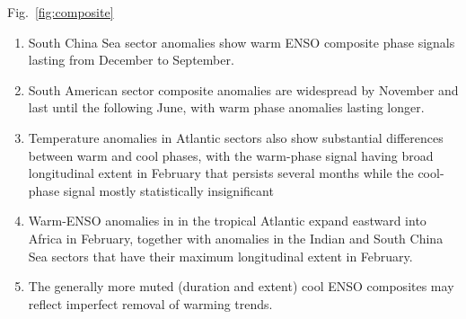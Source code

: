 \documentclass[aspectratio=169,xcolor=dvipsnames]{beamer}
\begin{document}
\begin{frame}{Fig.\ \ref{fig:composite}}
\begin{enumerate}
  \item South China Sea sector anomalies show warm ENSO composite
    phase signals lasting from December to September. 
  \item South American sector composite anomalies are widespread by
    November and last until the following June, with warm phase
    anomalies lasting longer.
  \item Temperature anomalies in Atlantic sectors also show
    substantial differences between warm and cool phases, with the
    warm-phase signal having broad longitudinal extent in February
    that persists several months while the cool-phase signal mostly
    statistically insignificant
  \item Warm-ENSO anomalies in in the tropical Atlantic expand
    eastward into Africa in February, together with anomalies in the
    Indian and South China Sea sectors that have their maximum
    longitudinal extent in February.
  \item The generally more muted (duration and extent) cool ENSO
    composites may reflect imperfect removal of warming trends.
    \end{enumerate}
\end{frame}
\end{document}
